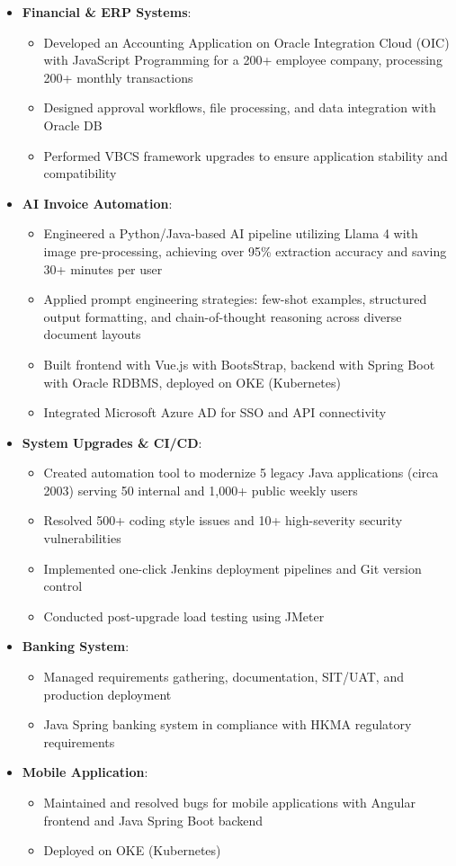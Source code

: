 \documentclass{resume}
\begin{document}
\begin{itemize}
  \item \textbf{Financial \& ERP Systems}:
    \begin{itemize}
      \item Developed an Accounting Application on Oracle Integration Cloud (OIC) with JavaScript Programming for a 200+ employee company, processing 200+ monthly transactions
      \item Designed approval workflows, file processing, and data integration with Oracle DB
      \item Performed VBCS framework upgrades to ensure application stability and compatibility
    \end{itemize}
  \item \textbf{AI Invoice Automation}:
    \begin{itemize}
      \item Engineered a Python/Java-based AI pipeline utilizing Llama 4 with image pre-processing, achieving over 95\% extraction accuracy and saving 30+ minutes per user
      \item Applied prompt engineering strategies: few-shot examples, structured output formatting, and chain-of-thought reasoning across diverse document layouts
      \item Built frontend with Vue.js with BootsStrap, backend with Spring Boot with Oracle RDBMS, deployed on OKE (Kubernetes)
      \item Integrated Microsoft Azure AD for SSO and API connectivity
    \end{itemize}
  \item \textbf{System Upgrades \& CI/CD}:
    \begin{itemize}
      \item Created automation tool to modernize 5 legacy Java applications (circa 2003) serving 50 internal and 1,000+ public weekly users
      \item Resolved 500+ coding style issues and 10+ high-severity security vulnerabilities
      \item Implemented one-click Jenkins deployment pipelines and Git version control
      \item Conducted post-upgrade load testing using JMeter
    \end{itemize}
  \item \textbf{Banking System}:
    \begin{itemize}
      \item Managed requirements gathering, documentation, SIT/UAT, and production deployment
      \item Java Spring banking system in compliance with HKMA regulatory requirements
    \end{itemize}
  \item \textbf{Mobile Application}:
    \begin{itemize}
      \item Maintained and resolved bugs for mobile applications with Angular frontend and Java Spring Boot backend
      \item Deployed on OKE (Kubernetes)
    \end{itemize}
\end{itemize}
\end{document}
